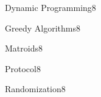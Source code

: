 \documentclass[a4paper]{article}
\begin{document}
\header

\begin{problem}{Dynamic Programming}{8}
\begin{acode}
\end{acode}
\end{problem}

\begin{problem}{Greedy Algorithms}{8}
\begin{acode}
\end{acode}
\end{problem}

\begin{problem}{Matroids}{8}
\begin{acode}
\end{acode}
\end{problem}

\begin{problem}{Protocol}{8}
\begin{acode}
\end{acode}
\end{problem}


\begin{problem}{Randomization}{8}
\begin{acode}
\end{acode}
\end{problem}
\end{document}
